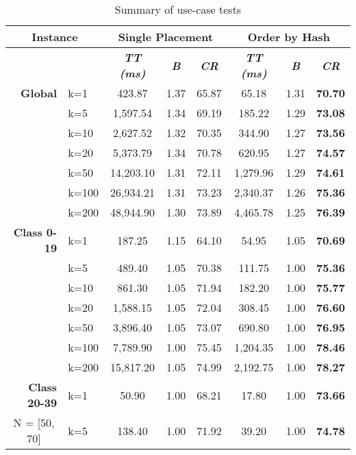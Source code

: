 \begin{table}[htbp]
    \caption{Summary of use-case tests}
    \begin{tabular}{|l|l|c|c|c|c|c|c|}
    \hline
    \multicolumn{ 2}{|c|}{\textbf{Instance}} & \multicolumn{ 3}{c|}{\textbf{Single Placement}} & \multicolumn{ 3}{c|}{\textbf{Order by Hash}} \\ \hline
    \multicolumn{ 2}{|l|}{} & \textbf{\textit{TT (ms)}} & \textbf{\textit{B}} & \textbf{\textit{CR}} & \textbf{\textit{TT (ms)}} & \textbf{\textit{B}} & \textbf{\textit{CR}} \\ \hline
    \multicolumn{1}{|r|}{\textbf{Global}} & k=1 & 423.87 & 1.37 & 65.87 & 65.18 & 1.31 & \textbf{70.70} \\ 
     & k=5 & 1,597.54 & 1.34 & 69.19 & 185.22 & 1.29 & \textbf{73.08} \\ 
     & k=10 & 2,627.52 & 1.32 & 70.35 & 344.90 & 1.27 & \textbf{73.56} \\ 
     & k=20 & 5,373.79 & 1.34 & 70.78 & 620.95 & 1.27 & \textbf{74.57} \\ 
     & k=50 & 14,203.10 & 1.31 & 72.11 & 1,279.96 & 1.29 & \textbf{74.61} \\ 
     & k=100 & 26,934.21 & 1.31 & 73.23 & 2,340.37 & 1.26 & \textbf{75.36} \\ 
     & k=200 & 48,944.90 & 1.30 & 73.89 & 4,465.78 & 1.25 & \textbf{76.39} \\ \hline
    \multicolumn{1}{|r|}{\textbf{Class 0-19}} & k=1 & 187.25 & 1.15 & 64.10 & 54.95 & 1.05 & \textbf{70.69} \\ 
     & k=5 & 489.40 & 1.05 & 70.38 & 111.75 & 1.00 & \textbf{75.36} \\ 
     & k=10 & 861.30 & 1.05 & 71.94 & 182.20 & 1.00 & \textbf{75.77} \\ 
     & k=20 & 1,588.15 & 1.05 & 72.04 & 308.45 & 1.00 & \textbf{76.60} \\ 
     & k=50 & 3,896.40 & 1.05 & 73.07 & 690.80 & 1.00 & \textbf{76.95} \\ 
     & k=100 & 7,789.90 & 1.00 & 75.45 & 1,204.35 & 1.00 & \textbf{78.46} \\ 
     & k=200 & 15,817.20 & 1.05 & 74.99 & 2,192.75 & 1.00 & \textbf{78.27} \\ \hline
    \multicolumn{1}{|r|}{\textbf{Class 20-39}} & k=1 & 50.90 & 1.00 & 68.21 & 17.80 & 1.00 & \textbf{73.66} \\ 
    \multicolumn{1}{|c|}{N = [50, 70]} & k=5 & 138.40 & 1.00 & 71.92 & 39.20 & 1.00 & \textbf{74.78} \\ 

\end{tabular}
\end{table}
